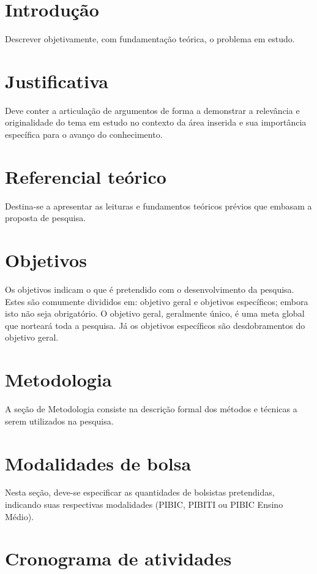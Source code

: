 \documentclass[a4paper,12pt]{article}
\begin{document}
\section{Introdução}

Descrever objetivamente, com fundamentação teórica, o problema em estudo.

\section{Justificativa}

Deve conter a articulação de argumentos de forma a demonstrar a relevância e
originalidade do tema em estudo no contexto da área inserida e sua importância
específica para o avanço do conhecimento.

\section{Referencial teórico}

Destina-se a apresentar as leituras e fundamentos teóricos prévios que embasam
a proposta de pesquisa.

\section{Objetivos}

Os objetivos indicam o que é pretendido com o desenvolvimento da pesquisa.
Estes são comumente divididos em: objetivo geral e objetivos específicos;
embora isto não seja obrigatório. O objetivo geral, geralmente único, é uma
meta global que norteará toda a pesquisa. Já os objetivos específicos são
desdobramentos do objetivo geral.

\section{Metodologia}

A seção de Metodologia consiste na descrição formal dos métodos e técnicas a
serem utilizados na pesquisa.

\section{Modalidades de bolsa}

Nesta seção, deve-se especificar as quantidades de bolsistas pretendidas,
indicando suas respectivas modalidades (PIBIC, PIBITI ou PIBIC Ensino Médio).

\section{Cronograma de atividades}
\end{document}
